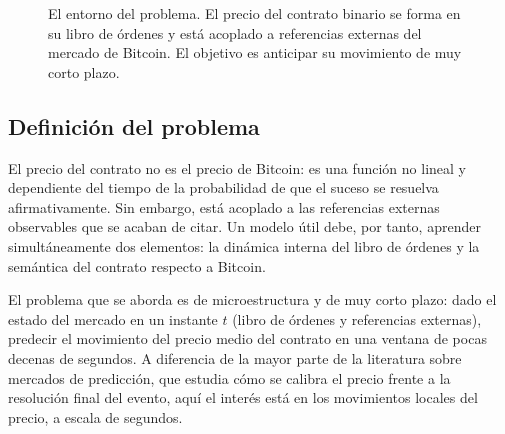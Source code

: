 \begin{figure}[h]
\centering
{}
\caption{El entorno del problema. El precio del contrato binario se forma en su libro de
órdenes y está acoplado a referencias externas del mercado de Bitcoin. El objetivo es
anticipar su movimiento de muy corto plazo.}
\label{fig:mercado}
\end{figure}

\subsection{Definición del problema}

El precio del contrato no es el precio de Bitcoin: es una función no lineal y dependiente
del tiempo de la probabilidad de que el suceso se resuelva afirmativamente. Sin embargo,
está acoplado a las referencias externas observables que se acaban de citar. Un modelo
útil debe, por tanto, aprender simultáneamente dos elementos: la dinámica interna del libro de
órdenes y la semántica del contrato respecto a Bitcoin.

El problema que se aborda es de microestructura y de muy corto plazo: dado el estado del
mercado en un instante $t$ (libro de órdenes y referencias externas), predecir el
movimiento del precio medio del contrato en una ventana de pocas decenas de segundos. A
diferencia de la mayor parte de la literatura sobre mercados de predicción, que estudia
cómo se calibra el precio frente a la resolución final del evento, aquí el interés está en
los movimientos locales del precio, a escala de segundos.

